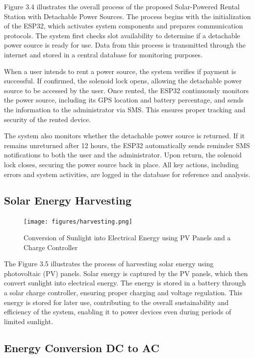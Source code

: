 {Figure 3.4 illustrates the overall process of the proposed Solar-Powered Rental Station with Detachable Power Sources. The process begins with the initialization of the ESP32, which activates system components and prepares communication protocols. The system first checks slot availability to determine if a detachable power source is ready for use. Data from this process is transmitted through the internet and stored in a central database for monitoring purposes.

When a user intends to rent a power source, the system verifies if payment is successful. If confirmed, the solenoid lock opens, allowing the detachable power source to be accessed by the user. Once rented, the ESP32 continuously monitors the power source, including its GPS location and battery percentage, and sends the information to the administrator via SMS. This ensures proper tracking and security of the rented device.

The system also monitors whether the detachable power source is returned. If it remains unreturned after 12 hours, the ESP32 automatically sends reminder SMS notifications to both the user and the administrator. Upon return, the solenoid lock closes, securing the power source back in place. All key actions, including errors and system activities, are logged in the database for reference and analysis.


\subsection{Solar Energy Harvesting}

\begin{figure}[H]
	\centering
	\caption{Conversion of Sunlight into Electrical Energy using PV Panels and a Charge Controller}
	\label{fig:solar harvesting}
	\texttt{[image: figures/harvesting.png]}
\end{figure}

The Figure 3.5 illustrates the process of harvesting solar energy using photovoltaic (PV) panels. Solar energy is captured by the PV panels, which then convert sunlight into electrical energy. The energy is stored in a  battery through a solar charge controller, ensuring proper charging and voltage regulation. This energy is stored for later use, contributing to the overall sustainability and efficiency of the system, enabling it to power devices even during periods of limited sunlight.

\subsection{Energy Conversion DC to AC}

}
